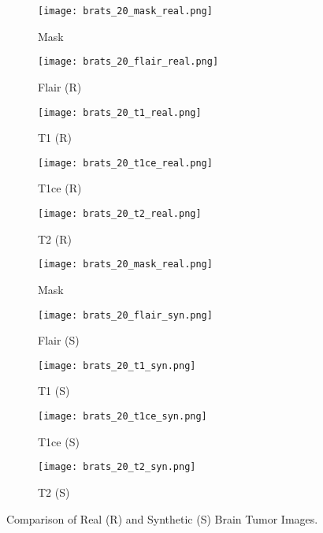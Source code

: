 \begin{figure*}[!ht]
    \centering
    \begin{subfigure}{0.16\textwidth}
        \texttt{[image: brats\_20\_mask\_real.png]}
        \caption{Mask}
        \label{fig:mask_real}
    \end{subfigure}
    \begin{subfigure}{0.16\textwidth}
        \texttt{[image: brats\_20\_flair\_real.png]}
        \caption{Flair (R)}
        \label{fig:flair_real}
    \end{subfigure}
    \begin{subfigure}{0.16\textwidth}
        \texttt{[image: brats\_20\_t1\_real.png]}
        \caption{T1 (R)}
        \label{fig:t1_real}
    \end{subfigure}
    \begin{subfigure}{0.16\textwidth}
        \texttt{[image: brats\_20\_t1ce\_real.png]}
        \caption{T1ce (R)}
        \label{fig:t1c_real}
    \end{subfigure}
    \begin{subfigure}{0.16\textwidth}
        \texttt{[image: brats\_20\_t2\_real.png]}
        \caption{T2 (R)}
        \label{fig:t2_real}
    \end{subfigure}
    
    \vspace{0.5em} %

    \begin{subfigure}{0.16\textwidth}
        \texttt{[image: brats\_20\_mask\_real.png]}
        \caption{Mask}
        \label{fig:mask_synthetic}
    \end{subfigure}
    \begin{subfigure}{0.16\textwidth}
        \texttt{[image: brats\_20\_flair\_syn.png]}
        \caption{Flair (S)}
        \label{fig:flair_synthetic}
    \end{subfigure}
    \begin{subfigure}{0.16\textwidth}
        \texttt{[image: brats\_20\_t1\_syn.png]}
        \caption{T1 (S)}
        \label{fig:t1_synthetic}
    \end{subfigure}
    \begin{subfigure}{0.16\textwidth}
        \texttt{[image: brats\_20\_t1ce\_syn.png]}
        \caption{T1ce (S)}
        \label{fig:t1c_synthetic}
    \end{subfigure}
    \begin{subfigure}{0.16\textwidth}
        \texttt{[image: brats\_20\_t2\_syn.png]}
        \caption{T2 (S)}
        \label{fig:t2_synthetic}
    \end{subfigure}

    \caption{Comparison of Real (R) and Synthetic (S) Brain Tumor Images.}
    \label{fig:brain_tumor_plot}
\end{figure*}